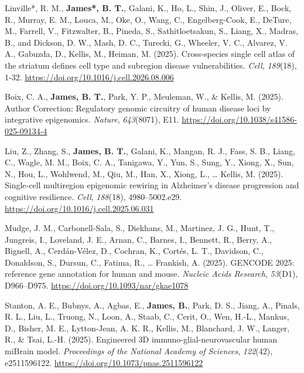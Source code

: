 \documentclass[letter,11pt]{article}
\begin{document}
		\item[\textbf{[S.1]}] {Linville*, R. M., \textbf{James*, B. T.}, Galani, K., Ho, L., Shin, J., Oliver, E., Bock, R., Murray, E. M., Louca, M., Oke, O., Wang, C., Engelberg-Cook, E., DeTure, M., Farrell, V., Fitzwalter, B., Pineda, S., Sathitloetsakun, S., Liang, X., Madras, B., and Dickson, D. W., Mash, D. C., Turecki, G., Wheeler, V. C., Alvarez, V. A., Gabuzda, D., Kellis, M., Heiman, M. (2025). Cross-species single cell atlas of the striatum defines cell type and subregion disease vulnerabilities. \textit{Cell}, \textit{189}(18), 1-32. \url{https://doi.org/10.1016/j.cell.2026.08.006}}

		\item[\textbf{[J.2]}] {Boix, C. A., \textbf{James, B. T.}, Park, Y. P., Meuleman, W., \& Kellis, M. (2025). Author Correction: Regulatory genomic circuitry of human disease loci by integrative epigenomics. \textit{Nature}, \textit{643}(8071), E11. \url{https://doi.org/10.1038/s41586-025-09134-4}}

		\item[\textbf{[J.3]}]{Liu, Z., Zhang, S., \textbf{James, B. T.}, Galani, K., Mangan, R. J., Fass, S. B., Liang, C., Wagle, M. M., Boix, C. A., Tanigawa, Y., Yun, S., Sung, Y., Xiong, X., Sun, N., Hou, L., Wohlwend, M., Qiu, M., Han, X., Xiong, L., … Kellis, M. (2025). Single-cell multiregion epigenomic rewiring in Alzheimer’s disease progression and cognitive resilience. \textit{Cell}, \textit{188}(18), 4980–5002.e29. \url{https://doi.org/10.1016/j.cell.2025.06.031}}

		\item[\textbf{[J.4]}]{Mudge, J. M., Carbonell-Sala, S., Diekhans, M., Martinez, J. G., Hunt, T., Jungreis, I., Loveland, J. E., Arnan, C., Barnes, I., Bennett, R., Berry, A., Bignell, A., Cerdán-Vélez, D., Cochran, K., Cortés, L. T., Davidson, C., Donaldson, S., Dursun, C., Fatima, R., … Frankish, A. (2025). GENCODE 2025: reference gene annotation for human and mouse. \textit{Nucleic Acids Research}, \textit{53}(D1), D966–D975. \url{https://doi.org/10.1093/nar/gkae1078}}

		\item[\textbf{[J.5]}]{Stanton, A. E., Bubnys, A., Agbas, E., \textbf{James, B.}, Park, D. S., Jiang, A., Pinals, R. L., Liu, L., Truong, N., Loon, A., Staab, C., Cerit, O., Wen, H.-L., Mankus, D., Bisher, M. E., Lytton-Jean, A. K. R., Kellis, M., Blanchard, J. W., Langer, R., \& Tsai, L.-H. (2025). Engineered 3D immuno-glial-neurovascular human miBrain model. \textit{Proceedings of the National Academy of Sciences}, \textit{122}(42), e2511596122. \url{https://doi.org/10.1073/pnas.2511596122}}
\end{document}
